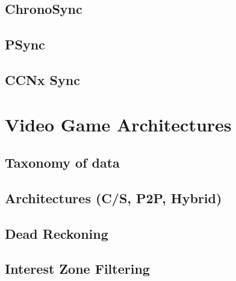 \subsection{ChronoSync}
\subsection{PSync}
\subsection{CCNx Sync}

\section{Video Game Architectures}
\subsection{Taxonomy of data}
\subsection{Architectures (C/S, P2P, Hybrid)}
\subsection{Dead Reckoning}
\subsection{Interest Zone Filtering}



